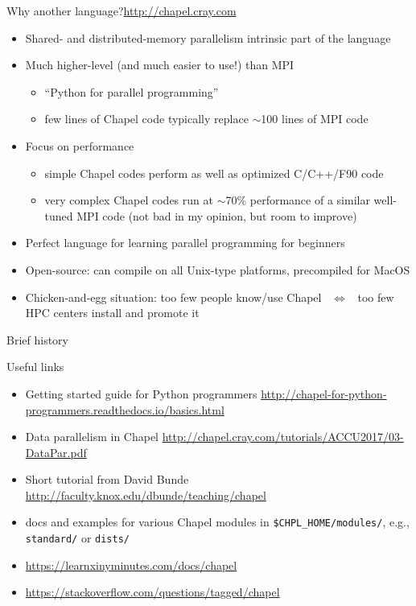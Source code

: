 \documentclass[xcolor=svgnames,aspectratio=169]{beamer}
\begin{document}
\begin{frame}{Why another language?}{\url{http://chapel.cray.com}}
  \begin{itemize}\setlength{\itemsep}{1mm}
    \item Shared- and distributed-memory parallelism intrinsic part of the language
    \item Much higher-level (and much easier to use!) than MPI
    \medskip
    \begin{itemize}\setlength{\itemsep}{1mm}
      \item ``Python for parallel programming''
      \item few lines of Chapel code typically replace $\sim$100 lines of MPI code
    \end{itemize}    
    \item Focus on performance
    \medskip
    \begin{itemize}\setlength{\itemsep}{1mm}
      \item simple Chapel codes perform as well as optimized C/C++/F90 code
      \item very complex Chapel codes run at $\sim$70\% performance of a similar well-tuned MPI code (not
      bad in my opinion, but room to improve)
    \end{itemize}    
    \item Perfect language for learning parallel programming for beginners
    \item Open-source: can compile on all Unix-type platforms, precompiled for MacOS
    \item Chicken-and-egg situation: too few people know/use Chapel ~$\Longleftrightarrow$~ too few HPC
    centers install and promote it
  \end{itemize}
\end{frame}

\begin{frame}{Brief history}
\end{frame}

\begin{frame}{Useful links}
  \begin{itemize}\setlength{\itemsep}{3mm}
    \item Getting started guide for Python programmers
    {\small\url{http://chapel-for-python-programmers.readthedocs.io/basics.html}}
    \item Data parallelism in Chapel \url{http://chapel.cray.com/tutorials/ACCU2017/03-DataPar.pdf}
    \item Short tutorial from David Bunde \url{http://faculty.knox.edu/dbunde/teaching/chapel}
    \item docs and examples for various Chapel modules in \texttt{\$CHPL\_HOME/modules/}, e.g.,
    \texttt{standard/} or \texttt{dists/}
    \item \url{https://learnxinyminutes.com/docs/chapel}
    \item \url{https://stackoverflow.com/questions/tagged/chapel}
  \end{itemize}
\end{frame}
\end{document}
